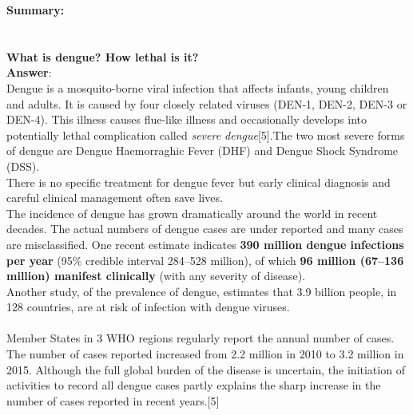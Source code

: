 \documentclass[11pt]{exam}
\begin{document}
\begin{questions}
\textbf{Summary:} \\
\\ \\

\question
\label{Q2.Lethal dengue} 
\textbf{What is dengue? How lethal is it?}\\
\textbf{Answer}:\\
Dengue is a mosquito-borne viral infection that affects infants, young children and adults. It is caused by four closely related viruses (DEN-1, DEN-2, DEN-3 or DEN-4).
This illness causes flue-like illness and occasionally develops into potentially lethal complication called \textit{severe dengue}[5].The two most severe forms of dengue
are Dengue Haemorraghic Fever (DHF) and Dengue Shock Syndrome (DSS). \\ There is no specific treatment for dengue fever but early clinical diagnosis and careful clinical management often save lives. \\
The incidence of dengue has grown dramatically around the world in recent decades. The actual numbers of dengue cases are under reported and many cases are misclassified. One recent estimate indicates \textbf{390 million dengue infections per year} (95\% credible interval 284–528 million), of which \textbf{96 million (67–136 million) manifest clinically} (with any severity of disease). \\ Another study, of the prevalence of dengue, estimates that 3.9 billion people, in 128 countries, are at risk of infection with dengue viruses. \\ \\
Member States in 3 WHO regions regularly report the annual number of cases. The number of cases reported increased from 2.2 million in 2010 to 3.2 million in 2015. Although the full global burden of the disease is uncertain, the initiation of activities to record all dengue cases partly explains the sharp increase in the number of cases reported in recent years.[5]\\ 


\end{questions}
\end{document}
